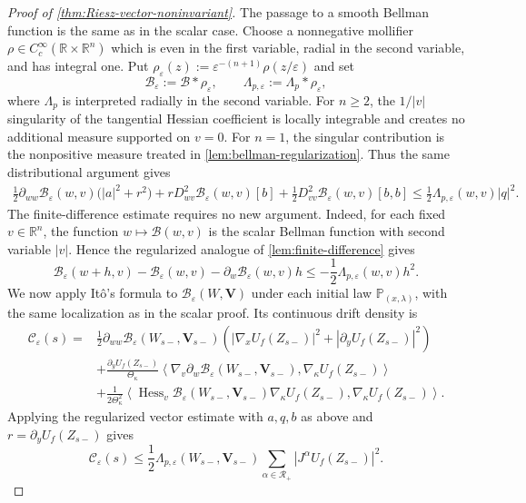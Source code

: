 \documentclass[11pt]{amsart}
\theoremstyle{definition}
\theoremstyle{remark}
\numberwithin{equation}{section}
\newcommand{\R}{\mathbb{R}}
\newcommand{\RR}{\mathcal{R}}
\begin{document}
\begin{proof}[Proof of \cref{thm:Riesz-vector-noninvariant}]
The passage to a smooth Bellman function is the same as in the scalar case.
Choose a nonnegative mollifier $\rho\in C_c^\infty(\R\times\R^n)$ which is even in the first variable, radial in the second variable, and has integral one. Put $\rho_\varepsilon(z):=\varepsilon^{-(n+1)}\rho(z/\varepsilon)$ and set
\[
\mathcal B_\varepsilon:=\mathcal B*\rho_\varepsilon,
\qquad
\Lambda_{p,\varepsilon}:=\Lambda_p*\rho_\varepsilon,
\]
where $\Lambda_p$ is interpreted radially in the second variable.
For $n\geq2$, the $1/|v|$ singularity of the tangential Hessian coefficient is locally integrable and creates no additional measure supported on $v=0$. For $n=1$, the singular contribution is the nonpositive measure treated in \cref{lem:bellman-regularization}. Thus the same distributional argument gives
\begin{align*}
\frac12\partial_{ww}\mathcal B_\varepsilon(w,v)\bigl(|a|^2+r^2\bigr)
+rD^2_{wv}\mathcal B_\varepsilon(w,v)[b]
+\frac12D^2_{vv}\mathcal B_\varepsilon(w,v)[b,b]
\leq\frac12\Lambda_{p,\varepsilon}(w,v)|q|^2.
\end{align*}
The finite-difference estimate requires no new argument. Indeed, for each fixed $v\in\R^n$, the function $w\longmapsto\mathcal B(w,v)$ is the scalar Bellman function with second variable $|v|$. Hence the regularized analogue of \cref{lem:finite-difference} gives
\[
\mathcal B_\varepsilon(w+h,v)-\mathcal B_\varepsilon(w,v)
-\partial_w\mathcal B_\varepsilon(w,v)h
\leq-\frac12\Lambda_{p,\varepsilon}(w,v)h^2.
\]
We now apply It\^o's formula to $\mathcal B_\varepsilon(W,\mathbf V)$ under each initial law $\mathbb P_{(x,\lambda)}$, with the same localization as in the scalar proof. Its continuous drift density is
\begin{align*}
\mathscr C_\varepsilon(s)
={}&\frac12\partial_{ww}\mathcal B_\varepsilon(W_{s-},\mathbf V_{s-})
\left(|\nabla_xU_f(Z_{s-})|^2+|\partial_yU_f(Z_{s-})|^2\right)\\
&+\frac{\partial_yU_f(Z_{s-})}{\Theta_\kappa}
\left\langle\nabla_v\partial_w\mathcal B_\varepsilon(W_{s-},\mathbf V_{s-}),
\nabla_\kappa U_f(Z_{s-})\right\rangle\\
&+\frac1{2\Theta_\kappa^2}
\left\langle\operatorname{Hess}_v\mathcal B_\varepsilon(W_{s-},\mathbf V_{s-})
\nabla_\kappa U_f(Z_{s-}),\nabla_\kappa U_f(Z_{s-})\right\rangle.
\end{align*}
Applying the regularized vector estimate with $a,q,b$ as above and $r=\partial_yU_f(Z_{s-})$ gives
\[
\mathscr C_\varepsilon(s)
\leq\frac12\Lambda_{p,\varepsilon}(W_{s-},\mathbf V_{s-})
\sum_{\alpha\in\RR_+}|J^\alpha U_f(Z_{s-})|^2.
\]
\end{proof}
\end{document}
